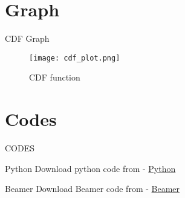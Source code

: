 \documentclass{beamer}
\begin{document}
\section{Graph}
\begin{frame}{CDF Graph}
    \begin{figure}[!ht]
		\centering
		\texttt{[image: cdf\_plot.png]}
		\caption{CDF function}
		\label{fig1}
	\end{figure}
\end{frame}

\section{Codes}
\begin{frame}{CODES}
    \begin{block}{Python}
         Download python code from - \href{https://github.com/Donal-08/Assignment_8/blob/main/code/cdf_plot.py}{Python}
    \end{block}

 \begin{block}{Beamer}
         Download Beamer code from - \href{https://github.com/jarpula-Bhanu/Assignment-8/blob/main/beamer_8.tex}{Beamer}
    \end{block}
\end{frame} 
\end{document}
